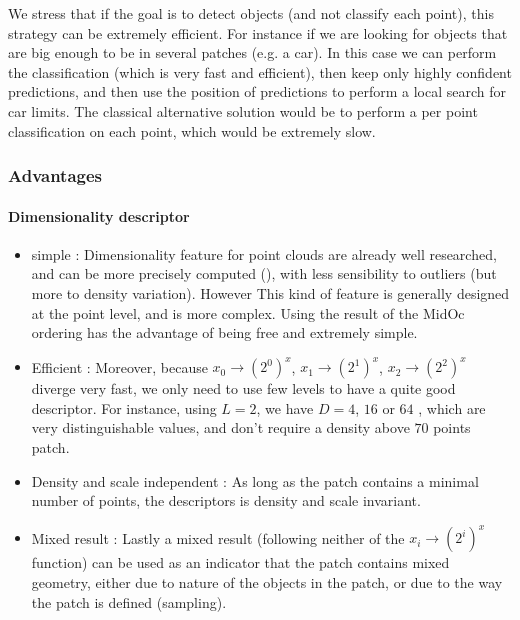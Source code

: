 			 	We stress that if the goal is to detect objects (and not classify each point), this strategy can be extremely efficient.
			 	For instance if we are looking for objects that are big enough to be in several patches (e.g. a car).
			 	In this case we can perform the classification (which is very fast and efficient), then keep only highly confident predictions, and then use the position of predictions to perform a local search for car limits.
			 	The classical alternative solution would be to perform a per point classification on each point, which would be extremely slow.
			 	
			 	
		\subsubsection{Advantages}
			\paragraph{Dimensionality descriptor}
			\begin{itemize}			
				\item simple : 
					Dimensionality feature for point clouds are already well researched, and can be more precisely computed (\cite{Demantke2014}), with less sensibility to outliers (but more to density variation). However This kind of feature is generally designed at the point level, and is more complex.
					Using the result of the MidOc ordering has the advantage of being free and extremely simple. 
				\item Efficient :
					Moreover, because $x_0 \rightarrow (2^0)^x$,
					 $x_1 \rightarrow (2^1)^x$, $x_2 \rightarrow (2^2)^x$ diverge very fast, we only need to use few levels to have a quite good descriptor. For instance, using $L=2$, we have $D=4$, $16$ or $64$ , which are very distinguishable values, and don't require a density above $70$ points \per patch. 
				\item Density and scale independent :
					As long as the patch contains a minimal number of points, the descriptors is density and scale invariant.
				\item Mixed result : 
					Lastly a mixed result (following neither of the $x_i \rightarrow (2^i)^x$ function) can be used as an indicator that the patch contains mixed geometry, either due to nature of the objects in the patch, or due to the way the patch is defined (sampling).
			\end{itemize}	
			
